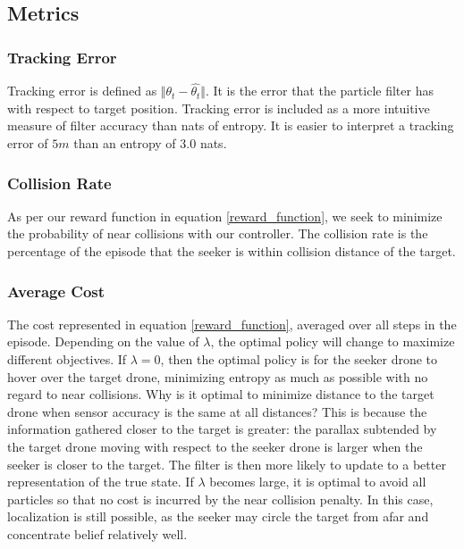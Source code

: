 \documentclass[10pt,twocolumn,letterpaper]{article}
\begin{document}
\subsection{Metrics}

\subsubsection{Tracking Error}
Tracking error is defined as $\Vert \theta_t - \hat{\theta_t}\Vert$.
It is the error that the particle filter has with respect to target position.
Tracking error is included as a more intuitive measure of filter accuracy than nats of entropy.
It is easier to interpret a tracking error of $5m$ than an entropy of $3.0$ nats.

\subsubsection{Collision Rate}
As per our reward function in equation \ref{reward_function}, we seek to minimize the probability of near collisions with our controller.
The collision rate is the percentage of the episode that the seeker is within collision distance of the target.

\subsubsection{Average Cost}
The cost represented in equation \ref{reward_function}, averaged over all steps in the episode.
Depending on the value of $\lambda$, the optimal policy will change to maximize different objectives.
If $\lambda = 0$, then the optimal policy is for the seeker drone to hover over the target drone, minimizing entropy as much as possible with no regard to near collisions.
Why is it optimal to minimize distance to the target drone when sensor accuracy is the same at all distances?
This is because the information gathered closer to the target is greater: the parallax subtended by the target drone moving with respect to the seeker drone is larger when the seeker is closer to the target.
The filter is then more likely to update to a better representation of the true state.
If $\lambda$ becomes large, it is optimal to avoid all particles so that no cost is incurred by the near collision penalty.
In this case, localization is still possible, as the seeker may circle the target from afar and concentrate belief relatively well.
\end{document}
